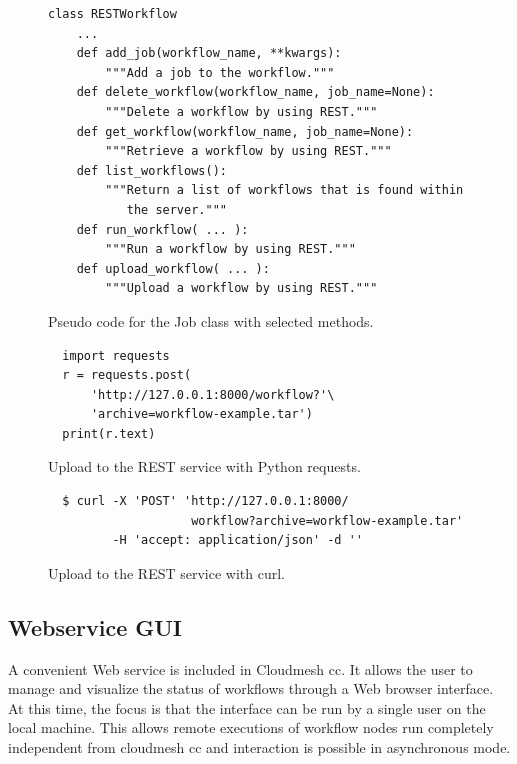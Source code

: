\begin{figure}[t]
{\scriptsize
\begin{verbatim}
class RESTWorkflow
    ...
    def add_job(workflow_name, **kwargs):
        """Add a job to the workflow."""
    def delete_workflow(workflow_name, job_name=None):
        """Delete a workflow by using REST."""
    def get_workflow(workflow_name, job_name=None):
        """Retrieve a workflow by using REST."""
    def list_workflows():
        """Return a list of workflows that is found within
           the server."""
    def run_workflow( ... ):
        """Run a workflow by using REST."""
    def upload_workflow( ... ):
        """Upload a workflow by using REST."""
\end{verbatim}
}

\caption{Pseudo code for the Job class with selected methods.}
\label{fig:code-workflow-rest-commandline}

\bigskip
{\scriptsize
\begin{verbatim}
  import requests
  r = requests.post(
      'http://127.0.0.1:8000/workflow?'\
      'archive=workflow-example.tar')
  print(r.text)
\end{verbatim}
}

\caption{Upload to the REST service with Python requests.}
\label{fig:code-workflow-requests}

\bigskip

{\scriptsize
\begin{verbatim}
  $ curl -X 'POST' 'http://127.0.0.1:8000/ 
                    workflow?archive=workflow-example.tar'
         -H 'accept: application/json' -d ''
\end{verbatim}
}%

\caption{Upload to the REST service with curl.}
\label{fig:code-workflow-curl}

\end{figure}




\subsection{Webservice GUI}

A convenient Web service is included in Cloudmesh cc. It allows the
user to manage and visualize the status of workflows through a Web
browser interface. At this time, the focus is that the interface can
be run by a single user on the local machine. This allows remote
executions of workflow nodes run completely independent from cloudmesh
cc and interaction is possible in asynchronous mode.

